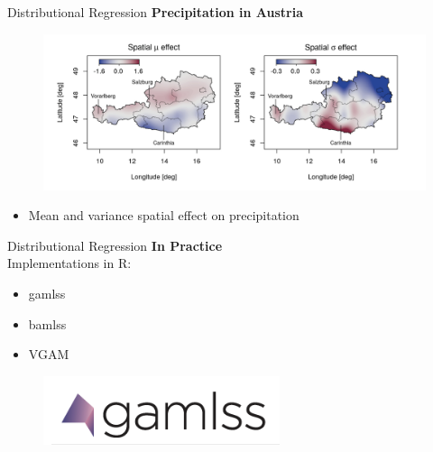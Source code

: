 \documentclass[t]{beamer} 	%
\begin{document}
\begin{frame}{Distributional Regression}
	\textbf{Precipitation in Austria} \\
	\citet{bamlss2017}
	\begin{figure}
		\centering
		\includegraphics[width=1.1\textwidth]{images/precipitation_austria.png}
	\end{figure}
	\begin{itemize}
		\item Mean and variance spatial effect on precipitation
	\end{itemize}
\end{frame}

\begin{frame}{Distributional Regression}
	\textbf{In Practice} \\
	Implementations in R:
	\begin{itemize}
		\item gamlss \citep[Generalized Additive Models for Location, Scale and Shape]{gamlssbook}
		\item bamlss \citep{bamlss2017}
		\item VGAM \citep[Vector Generalized Additive Models]{vgampackage}
	\end{itemize}
	\begin{figure}
		\centering
		\includegraphics[scale=0.5, trim={0cm 0.2cm 0cm 0cm}, clip]{images/gamlss_logo.png}
	\end{figure}
\end{frame}
\end{document}
